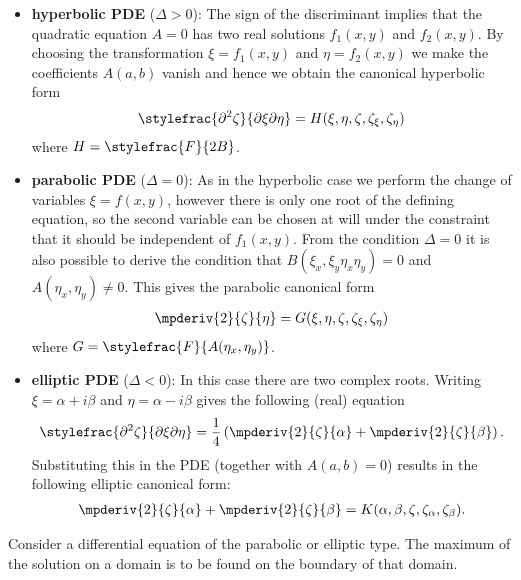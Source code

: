 {        \begin{itemize}
            \item \textbf{hyperbolic PDE} ($\Delta>0$): The sign of the discriminant implies that the quadratic equation $A=0$ has two real solutions $f_1(x, y)$ and $f_2(x, y)$. By choosing the transformation $\xi=f_1(x, y)$ and $\eta=f_2(x, y)$ we make the coefficients $A(a,b)$ vanish and hence we obtain the canonical hyperbolic form
                \begin{gather}
                    \label{pde:hyperbolic_canonical_form}
                    \stylefrac{\partial^2\zeta}{\partial\xi\partial\eta} = H(\xi,\eta,\zeta,\zeta_\xi,\zeta_\eta)
                \end{gather}
                where $H = \stylefrac{F}{2B}$.
            \item \textbf{parabolic PDE} ($\Delta=0$): As in the hyperbolic case we perform the change of variables $\xi = f(x, y)$, however there is only one root of the defining equation, so the second variable can be chosen at will under the constraint that it should be independent of $f_1(x, y)$. From the condition $\Delta=0$ it is also possible to derive the condition that $B(\xi_x,\xi_y\eta_x\eta_y) = 0$ and $A(\eta_x,\eta_y)\neq0$. This gives the parabolic canonical form
                \begin{gather}
                    \label{pde:parabolic_canonical_form}
                    \mpderiv{2}{\zeta}{\eta} = G(\xi,\eta,\zeta,\zeta_\xi,\zeta_\eta)
                \end{gather}
                where $G = \stylefrac{F}{A(\eta_x,\eta_y)}$.
            \item \textbf{elliptic PDE} ($\Delta<0$): In this case there are two complex roots. Writing $\xi = \alpha + i\beta$ and $\eta = \alpha - i\beta$ gives the following (real) equation \[\stylefrac{\partial^2\zeta}{\partial\xi\partial\eta} = \frac{1}{4}\left(\mpderiv{2}{\zeta}{\alpha} + \mpderiv{2}{\zeta}{\beta}\right).\] Substituting this in the PDE (together with $A(a,b)=0$) results in the following elliptic canonical form:
                \begin{gather}
                    \label{pde:elliptic_canonical_form}
                    \mpderiv{2}{\zeta}{\alpha} + \mpderiv{2}{\zeta}{\beta} = K(\alpha,\beta,\zeta,\zeta_\alpha,\zeta_\beta).
                \end{gather}
        \end{itemize}
    }

    \begin{theorem}\label{pde:theorem:maximum_principle}
        Consider a differential equation of the parabolic or elliptic type. The maximum of the solution on a domain is to be found on the boundary of that domain.
    \end{theorem}

